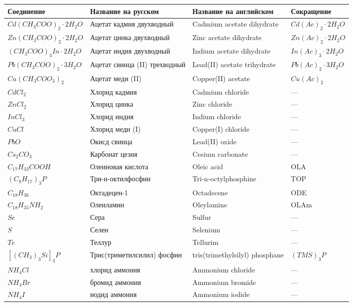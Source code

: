 \begin{longtable}{|p{3cm}|p{4.5cm}|p{4.5cm}|p{3cm}|}
    \hline
    \textbf{Соединение} & \textbf{Название на русском} & \textbf{Название на английском} & \textbf{Сокращение} \\
    \hline
    $Cd(CH_3COO)_2 \cdot 2H_2O$	& Ацетат кадмия двухводный	& Cadmium acetate dihydrate	& $Cd(Ac)_2 \cdot 2H_2O$ \\
    \hline
    $Zn(CH_3COO)_2 \cdot 2H_2O$	& Ацетат цинка двухводный	& Zinc acetate dihydrate	& $Zn(Ac)_2 \cdot 2H_2O$ \\
    \hline
    $(CH_3COO)_3In \cdot 2H_2O$ & Ацетат индия двухводный & Indium acetate dihydrate & $In(Ac)_3 \cdot 2H_2O$ \\
    \hline
    $Pb(CH_3COO)_2 \cdot 3H_2O$ & Ацетат свинца (II) трехводный	 & Lead(II) acetate trihydrate & $Pb(Ac)_2 \cdot 3H_2O$ \\
    \hline
    $Cu(CH_3COO_3)_2$ &	Ацетат меди (II) & Copper(II) acetate & $Cu(Ac)_2$ \\
    \hline
    $CdCl_2$	&Хлорид кадмия	&Cadmium chloride&	--- \\
    \hline
    $ZnCl_2$ &	Хлорид цинка&	Zinc chloride&	--- \\
    \hline
    $InCl_3$	&Хлорид индия&	Indium chloride	&--- \\
    \hline
   $ CuCl$	&Хлорид меди (I)&	Copper(I) chloride&	--- \\
    \hline
    $PbO$&	Окисд свинца&	Lead(II) oxide&	--- \\
    \hline
    $Cs_2CO_3$& 	Карбонат цезия&	Cesium carbonate&	--- \\
    \hline
    $C_{17}H_{33}COOH$&	Олеиновая кислота&	Oleic acid&	OLA \\
    \hline
    $(C_8H_{17})_3P$	&Три-н-октилфосфин	&Tri-n-octylphosphine&	TOP \\
    \hline
    $C_{18}H_{36}$ &	Октадецен-1	&Octadecene&	ODE \\
    \hline
    $C_{18}H_{35}NH_2$&	Олеиламин&	Oleylamine&	OLAm \\
    \hline
    $Se$&	Сера	&Sulfur&	--- \\
    \hline
    $S$&	Селен&	Selenium&	--- \\
    \hline
    $Te$&	Теллур&	Tellurim&	--- \\
    \hline
    $[(CH_3)_3Si]_3P$&	Трис(триметилсилил) фосфин&	tris(trimethylsilyl) phosphane	&$(TMS)_3P$ \\
    \hline
    $NH_4Cl$	&хлорид аммония&	Ammonium chloride&	--- \\
    \hline
    $NH_4Br$	&бромид аммония&	Ammonium bromide&	--- \\
    \hline
    $NH_4I$	&иодид аммония&	Ammonium iodide&	--- \\
    \hline
\end{longtable}

